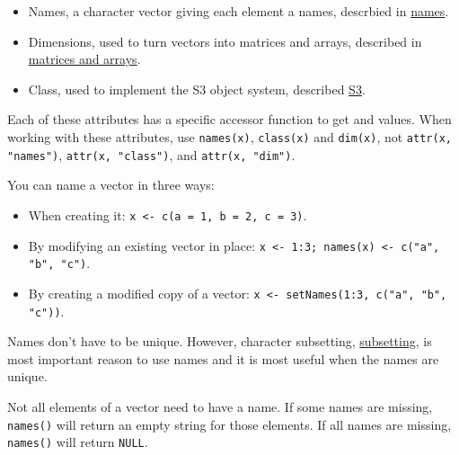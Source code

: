 \begin{itemize}
\item
  Names, a character vector giving each element a names, descrbied in
  \hyperref[vector-names]{names}.
\item
  Dimensions, used to turn vectors into matrices and arrays, described
  in \hyperref[matrices-and-arrays]{matrices and arrays}.
\item
  Class, used to implement the S3 object system, described
  \hyperref[s3]{S3}.
\end{itemize}

Each of these attributes has a specific accessor function to get and
values. When working with these attributes, use \texttt{names(x)},
\texttt{class(x)} and \texttt{dim(x)}, not \texttt{attr(x, "names")},
\texttt{attr(x, "class")}, and \texttt{attr(x, "dim")}.


You can name a vector in three ways:

\begin{itemize}
\item
  When creating it: \texttt{x \textless{}- c(a = 1, b = 2, c = 3)}.
\item
  By modifying an existing vector in place:
  \texttt{x \textless{}- 1:3; names(x) \textless{}- c("a", "b", "c")}.
\item
  By creating a modified copy of a vector:
  \texttt{x \textless{}- setNames(1:3, c("a", "b", "c"))}.
\end{itemize}

Names don't have to be unique. However, character subsetting,
\hyperref[lookup-tables]{subsetting}, is most important reason to use
names and it is most useful when the names are unique.

Not all elements of a vector need to have a name. If some names are
missing, \texttt{names()} will return an empty string for those
elements. If all names are missing, \texttt{names()} will return
\texttt{NULL}.

\begin{Shaded}
\begin{Highlighting}[]
\StringTok{ }\NormalTok{(} \NormalTok{, }\NormalTok{, }\NormalTok{)}

\StringTok{ }\NormalTok{(}\NormalTok{, }\NormalTok{, }\NormalTok{)}
\end{Highlighting}
\end{Shaded}

